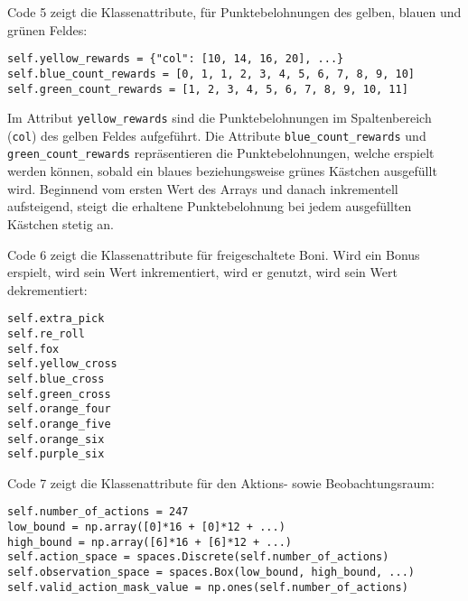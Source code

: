 \begin{minipage}{\linewidth}
Code 5 zeigt die Klassenattribute, für Punktebelohnungen des gelben, blauen und grünen Feldes:
\vspace{0.5cm}
\begin{lstlisting}[caption={Klassenattribute für freizuschaltende Punktebelohnungen des gelben, blauen und grünen Feldes}, basicstyle=\ttfamily]
self.yellow_rewards = {"col": [10, 14, 16, 20], ...}
self.blue_count_rewards = [0, 1, 1, 2, 3, 4, 5, 6, 7, 8, 9, 10]
self.green_count_rewards = [1, 2, 3, 4, 5, 6, 7, 8, 9, 10, 11]
\end{lstlisting}
\end{minipage}

Im Attribut \texttt{yellow\_rewards} sind die Punktebelohnungen im Spaltenbereich (\texttt{col}) des gelben Feldes aufgeführt. Die Attribute \texttt{blue\_count\_rewards} und \texttt{green\_count\_rewards} repräsentieren die Punktebelohnungen, welche erspielt werden können, sobald ein blaues beziehungsweise grünes Kästchen ausgefüllt wird. Beginnend vom ersten Wert des Arrays und danach inkrementell aufsteigend, steigt die erhaltene Punktebelohnung bei jedem ausgefüllten Kästchen stetig an.\\

\begin{minipage}{\linewidth}
Code 6 zeigt die Klassenattribute für freigeschaltete Boni. Wird ein Bonus erspielt, wird sein Wert inkrementiert, wird er genutzt, wird sein Wert dekrementiert:
\vspace{0.5cm}
\begin{lstlisting}[caption={Klassenattribute für freigespielte Boni}, basicstyle=\ttfamily]
self.extra_pick
self.re_roll
self.fox
self.yellow_cross
self.blue_cross
self.green_cross
self.orange_four
self.orange_five
self.orange_six
self.purple_six
\end{lstlisting}
\end{minipage}

\newpage
\begin{minipage}{\linewidth}
Code 7 zeigt die Klassenattribute für den Aktions- sowie Beobachtungsraum:
\vspace{0.5cm}
\begin{lstlisting}[caption={Klassenattribute des Aktions- und Beobachtungsraumes}, basicstyle=\ttfamily]
self.number_of_actions = 247
low_bound = np.array([0]*16 + [0]*12 + ...)
high_bound = np.array([6]*16 + [6]*12 + ...)
self.action_space = spaces.Discrete(self.number_of_actions)
self.observation_space = spaces.Box(low_bound, high_bound, ...)
self.valid_action_mask_value = np.ones(self.number_of_actions)
\end{lstlisting}
\end{minipage}

